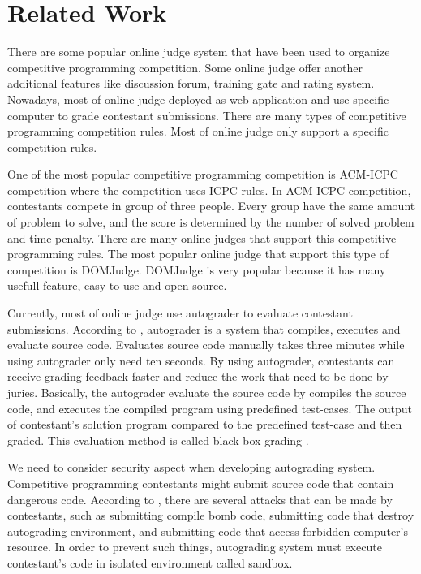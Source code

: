 \documentclass[conference]{IEEEtran}
\begin{document}
\section{Related Work}

There are some popular online judge system that have been used to organize competitive programming competition. Some online judge offer another additional features like discussion forum, training gate and rating system. Nowadays, most of online judge deployed as web application and use specific computer to grade contestant submissions. There are many types of competitive programming competition rules. Most of online judge only support a specific competition rules.

One of the most popular competitive programming competition is ACM-ICPC competition where the competition uses ICPC rules. In ACM-ICPC competition, contestants compete in group of three people. Every group have the same amount of problem to solve, and the score is determined by the number of solved problem and time penalty. There are many online judges that support this competitive programming rules. The most popular online judge that support this type of competition is DOMJudge. DOMJudge is very popular because it has many usefull feature, easy to use and open source.

Currently, most of online judge use autograder to evaluate contestant submissions. According to \cite{danutamalms}, autograder is a system that compiles, executes and evaluate source code. Evaluates source code manually takes three minutes while using autograder only need ten seconds. By using autograder, contestants can receive grading feedback faster and reduce the work that need to be done by juries. Basically, the autograder evaluate the source code by compiles the source code, and executes the compiled program using predefined test-cases. The output of contestant's solution program compared to the predefined test-case and then graded. This evaluation method is called black-box grading \cite{jordanioi}.

We need to consider security aspect when developing autograding system. Competitive programming contestants might submit source code that contain dangerous code. According to \cite{wasikojsurvey}, there are several attacks that can be made by contestants, such as submitting compile bomb code, submitting code that destroy autograding environment, and submitting code that access forbidden computer's resource. In order to prevent such things, autograding system must execute contestant's code in isolated environment called sandbox.
\end{document}
